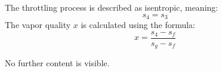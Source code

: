 The throttling process is described as isentropic, meaning:  
\[
s_4 = s_3
\]  
The vapor quality \( x \) is calculated using the formula:  
\[
x = \frac{s_4 - s_f}{s_g - s_f}
\]  

No further content is visible.